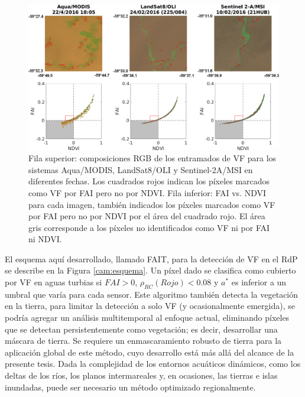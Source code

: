         \begin{figure}
        \centering
        \includegraphics[width=\textwidth]{cam/figures/FAIvsNDVI.png}
        \caption[Composiciones RGB de los entramados de VF para los sistemas Aqua/MODIS, OLI y MSI-A en diferentes fechas, indicando los píxeles marcados como vegetación flotante por FAI pero no por NDVI.]{Fila superior: composiciones RGB de los entramados de VF para los sistemas Aqua/MODIS, LandSat8/OLI y Sentinel-2A/MSI en diferentes fechas. Los cuadrados rojos indican los píxeles marcados como VF por FAI pero no por NDVI. Fila inferior: FAI vs. NDVI para cada imagen, también indicados los píxeles marcados como VF por FAI pero no por NDVI por el área del cuadrado rojo. El área gris corresponde a los píxeles no identificados como VF ni por FAI ni NDVI.}
        \label{cam:FAIvsNDVI}
        \end{figure}

        El esquema aquí desarrollado, llamado FAIT, para la detección de VF en el RdP se describe en la Figura \ref{cam:esquema}. Un píxel dado se clasifica como cubierto por VF en aguas turbias si $FAI>0$, $\rho_{RC}(Rojo)<0.08$ y $a^{*}$ es inferior a un umbral que varía para cada sensor. Este algoritmo también detecta la vegetación en la tierra, para limitar la detección a solo VF (y ocasionalmente emergida), se podría agregar un análisis multitemporal al enfoque actual, eliminando píxeles que se detectan persistentemente como vegetación; es decir, desarrollar una máscara de tierra. Se requiere un enmascaramiento robusto de tierra para la aplicación global de este método, cuyo desarrollo está más allá del alcance de la presente tesis. Dada la complejidad de los entornos acuáticos dinámicos, como los deltas de los ríos, los planos intermareales y, en ocasiones, las tierras e islas inundadas, puede ser necesario un método optimizado regionalmente.

